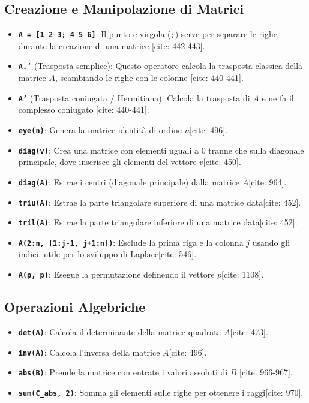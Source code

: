\documentclass[a4paper,12pt]{article}
\begin{document}
	\subsection*{Creazione e Manipolazione di Matrici}
	\begin{itemize}
		\item \textbf{\texttt{A = [1 2 3; 4 5 6]}}: Il punto e virgola (\texttt{;}) serve per separare le righe durante la creazione di una matrice [cite: 442-443].
		\item \textbf{\texttt{A.'}} (Trasposta semplice): Questo operatore calcola la trasposta classica della matrice $A$, scambiando le righe con le colonne [cite: 440-441].
		\item \textbf{\texttt{A'}} (Trasposta coniugata / Hermitiana): Calcola la trasposta di $A$ e ne fa il complesso coniugato [cite: 440-441].
		\item \textbf{\texttt{eye(n)}}: Genera la matrice identità di ordine $n$[cite: 496].
		\item \textbf{\texttt{diag(v)}}: Crea una matrice con elementi uguali a 0 tranne che sulla diagonale principale, dove inserisce gli elementi del vettore $v$[cite: 450].
		\item \textbf{\texttt{diag(A)}}: Estrae i centri (diagonale principale) dalla matrice $A$[cite: 964].
		\item \textbf{\texttt{triu(A)}}: Estrae la parte triangolare superiore di una matrice data[cite: 452].
		\item \textbf{\texttt{tril(A)}}: Estrae la parte triangolare inferiore di una matrice data[cite: 452].
		\item \textbf{\texttt{A(2:n, [1:j-1, j+1:n])}}: Esclude la prima riga e la colonna $j$ usando gli indici, utile per lo sviluppo di Laplace[cite: 546].
		\item \textbf{\texttt{A(p, p)}}: Esegue la permutazione definendo il vettore $p$[cite: 1108].
	\end{itemize}
	
	\subsection*{Operazioni Algebriche}
	\begin{itemize}
		\item \textbf{\texttt{det(A)}}: Calcola il determinante della matrice quadrata $A$[cite: 473].
		\item \textbf{\texttt{inv(A)}}: Calcola l'inversa della matrice $A$[cite: 496].
		\item \textbf{\texttt{abs(B)}}: Prende la matrice con entrate i valori assoluti di $B$ [cite: 966-967].
		\item \textbf{\texttt{sum(C\_abs, 2)}}: Somma gli elementi sulle righe per ottenere i raggi[cite: 970].
	\end{itemize}
	
\end{document}
